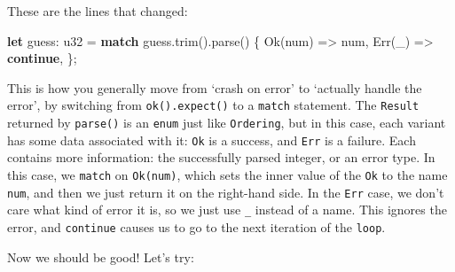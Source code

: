 \documentclass[a4paper,]{book}
\newenvironment{Shaded}{\begin{snugshade}}{\end{snugshade}}
\newcommand{\KeywordTok}[1]{\textcolor[rgb]{0.13,0.29,0.53}{\textbf{{#1}}}}
\newcommand{\DataTypeTok}[1]{\textcolor[rgb]{0.13,0.29,0.53}{{#1}}}
\newcommand{\ConstantTok}[1]{\textcolor[rgb]{0.00,0.00,0.00}{{#1}}}
\newcommand{\NormalTok}[1]{{#1}}
\begin{document}
These are the lines that changed:

\begin{Shaded}
\begin{Highlighting}[]
\KeywordTok{let} \NormalTok{guess: }\DataTypeTok{u32} \NormalTok{= }\KeywordTok{match} \NormalTok{guess.trim().parse() \{}
    \ConstantTok{Ok}\NormalTok{(num) => num,}
    \ConstantTok{Err}\NormalTok{(_) => }\KeywordTok{continue}\NormalTok{,}
\NormalTok{\};}
\end{Highlighting}
\end{Shaded}

This is how you generally move from `crash on error' to `actually handle
the error', by switching from \texttt{ok().expect()} to a \texttt{match}
statement. The \texttt{Result} returned by \texttt{parse()} is an
\texttt{enum} just like \texttt{Ordering}, but in this case, each
variant has some data associated with it: \texttt{Ok} is a success, and
\texttt{Err} is a failure. Each contains more information: the
successfully parsed integer, or an error type. In this case, we
\texttt{match} on \texttt{Ok(num)}, which sets the inner value of the
\texttt{Ok} to the name \texttt{num}, and then we just return it on the
right-hand side. In the \texttt{Err} case, we don't care what kind of
error it is, so we just use \texttt{\_} instead of a name. This ignores
the error, and \texttt{continue} causes us to go to the next iteration
of the \texttt{loop}.

Now we should be good! Let's try:

\begin{Shaded}
\end{Shaded}
\end{document}
